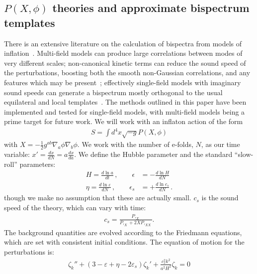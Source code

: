 \documentclass[a4paper,12pt]{extarticle}
\newcommand{\eps}{\epsilon}
\begin{document}
\subsection{\boldmath $P(X,\phi)$ theories and approximate bispectrum templates}\label{sec:rev_px}
There is an extensive literature on the calculation
of bispectra from models of inflation~\cite{chen_easther_lim_1,chen_easther_lim_2,chen_ng_0605,seery_ng_0503,px_burrage,adshead,flauger_pajer_resonant,features_bartolo,bdy_passaglia}.
Multi-field models can produce large
correlations between modes of very different scales;
non-canonical kinetic terms can reduce the sound speed of the perturbations,
boosting both the smooth non-Gaussian correlations, and any
features which may be present~\cite{dbi_adshead,dbi_in_the_sky,dbi_miranda,dbi_silverstein,dbi_step_miranda,chen_folded_resonant,osc_avila};
effectively single-field models with imaginary sound speeds can generate a bispectrum
mostly orthogonal to the usual equilateral and local templates~\cite{RP_1}.
The methods outlined in this paper have been implemented
and tested for single-field models,
with multi-field models being a prime target for future work.
We will work with an inflaton action of the form
\begin{align}
S = \int d^4x \sqrt{-g}P(X,\phi)
\end{align}
with $X=-\frac{1}{2}g^{ab}\nabla_a \phi\nabla_b \phi$.
We work with the number of e-folds, $N$, as our time variable:
$x'=\frac{dx}{dN}=a\frac{dx}{da}$.
We define the Hubble parameter and the standard ``slow-roll'' parameters:
\begin{equation}
\label{slowrollparams}
\begin{split}
    H = \frac{d\ln a}{dt}	\,,
    \qquad
    \eps &= -\frac{d\ln H}{dN}	\\
    \eta = \frac{d\ln \varepsilon}{dN}	\,,
    \qquad
    \eps_s &= +\frac{d\ln c_s}{dN}	\,.
\end{split}
\end{equation}
though we make no assumption that these are actually small.
$c_s$ is the sound speed of the theory, which can vary with time:
\begin{align}
c_s=\frac{P,_X}{P,_X+2XP,_{XX}}.
\end{align}
The background quantities are evolved according to the Friedmann equations,
which are set with consistent initial conditions.
The equation of motion for the perturbations is:
\begin{align}\label{modefneqn}
\zeta_k''+(3-\varepsilon+\eta-2\varepsilon_s)\zeta_k'+\frac{c_s^2k^2}{a^2H^2}\zeta_k=0
\end{align}
\end{document}
